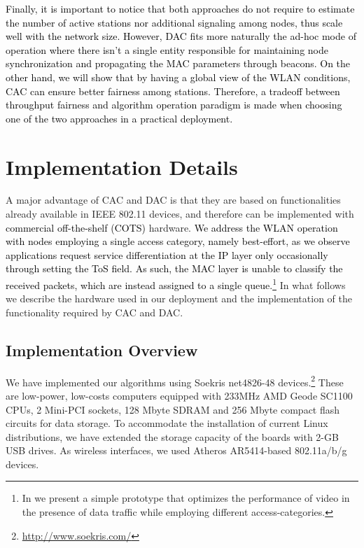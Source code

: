 \documentclass[a4paper,10pt]{article}
\newcommand{\revs}[1]{\textcolor{black}{#1}}
\begin{document}
\revs{Finally, it is important to notice that both approaches do not require to estimate the number of active stations nor additional signaling among nodes, thus scale well with the network size. However, DAC fits more naturally the ad-hoc mode of operation where there isn't a single entity responsible for maintaining node synchronization and propagating the MAC parameters through beacons. On the other hand, we will show that by having a global view of the WLAN conditions, CAC can ensure better fairness among stations. Therefore, a tradeoff between throughput fairness and algorithm operation paradigm is made when choosing one of the two approaches in a practical deployment.}

\section{Implementation Details}
\label{sec:implementation}

A major advantage of CAC and DAC is that they are based on functionalities already available in IEEE 802.11 devices, and therefore can be implemented with \revs{commercial off-the-shelf (COTS)} hardware. \revs{We address the WLAN operation with nodes employing a single access category, namely best-effort, as we observe applications request service differentiation at the IP layer only occasionally through setting the ToS field. As such, the MAC layer is unable to classify the received packets, which are instead assigned to a single queue.\footnote{In \cite{tomccap} we present a simple prototype that optimizes the performance of video in the presence of data traffic while employing different access-categories.}} In what follows we describe the hardware used in our deployment and the implementation of the functionality required by CAC and DAC. 

\subsection{Implementation Overview}
We have implemented our algorithms using Soekris net4826-48 devices.\footnote{{\ttfamily \url{http://www.soekris.com/}}} These are low-power, low-costs computers equipped with 233MHz AMD Geode SC1100 CPUs, 2 Mini-PCI sockets, 128 Mbyte SDRAM and 256 Mbyte compact flash circuits for data storage. To accommodate the installation of current Linux distributions, we have extended the storage capacity of the boards with 2-GB USB drives. As wireless interfaces, we used Atheros AR5414-based 802.11a/b/g devices. 
\end{document}
